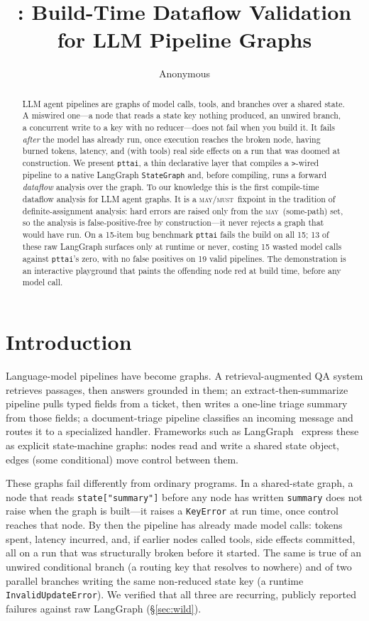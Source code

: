 \documentclass[11pt]{article}
\title{\code{pttai}: Build-Time Dataflow Validation for LLM Pipeline Graphs}
\author{
  Anonymous \\
}
\newcommand{\may}{\textsc{may}}
\newcommand{\must}{\textsc{must}}
\newcommand{\code}[1]{\texttt{#1}}
\begin{document}
\maketitle

\begin{abstract}
LLM agent pipelines are graphs of model calls, tools, and branches over a shared
state. A miswired one---a node that reads a state key nothing produced, an
unwired branch, a concurrent write to a key with no reducer---does not fail when
you build it. It fails \emph{after} the model has already run, once execution
reaches the broken node, having burned tokens, latency, and (with tools) real
side effects on a run that was doomed at construction. We present \code{pttai}, a
thin declarative layer that compiles a \code{>}-wired pipeline to a native
LangGraph \code{StateGraph} and, before compiling, runs a forward
\emph{dataflow} analysis over the graph. To our knowledge this is the first
compile-time dataflow analysis for LLM agent graphs. It is a \may/\must\ fixpoint
in the tradition of definite-assignment analysis: hard errors are raised only
from the \may\ (some-path) set, so the analysis is false-positive-free by
construction---it never rejects a graph that would have run. On a
15-item bug benchmark \code{pttai} fails the build on all 15; 13 of these raw
LangGraph surfaces only at runtime or never, costing 15 wasted model calls
against \code{pttai}'s zero, with no false positives on 19 valid pipelines. The
demonstration is an interactive playground that paints the offending node red at
build time, before any model call.
\end{abstract}

\section{Introduction}

Language-model pipelines have become graphs. A retrieval-augmented QA system
retrieves passages, then answers grounded in them; an extract-then-summarize
pipeline pulls typed fields from a ticket, then writes a one-line triage summary
from those fields; a document-triage pipeline classifies an incoming message and
routes it to a specialized handler. Frameworks such as
LangGraph~\citep{langgraph} express these as explicit state-machine graphs:
nodes read and write a shared state object, edges (some conditional) move control
between them.

These graphs fail differently from ordinary programs. In a shared-state graph,
a node that reads \code{state["summary"]} before any node has written
\code{summary} does not raise when the graph is built---it raises a
\code{KeyError} at run time, once control reaches that node. By then the pipeline
has already made model calls: tokens spent, latency incurred, and, if earlier
nodes called tools, side effects committed, all on a run that was structurally
broken before it started. The same is true of an unwired conditional branch (a
routing key that resolves to nowhere) and of two parallel branches writing the
same non-reduced state key (a runtime \code{InvalidUpdateError}). We verified
that all three are recurring, publicly reported failures against raw LangGraph
(\S\ref{sec:wild}).
\end{document}
